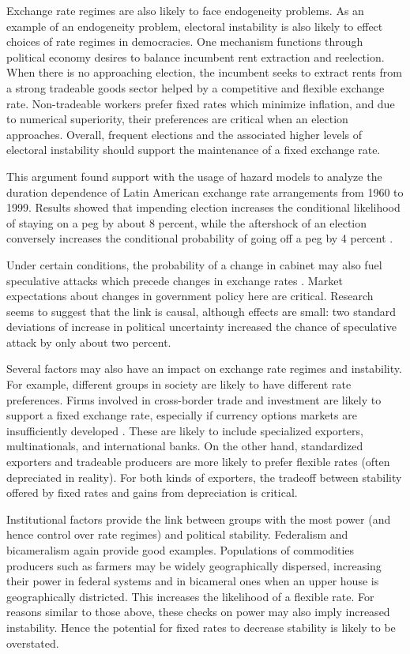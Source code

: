 \documentclass{article}
\begin{document}
    Exchange rate regimes are also likely to face endogeneity problems. As an example of an endogeneity problem, electoral instability is also likely to effect choices of rate regimes in democracies. One mechanism functions through political economy desires to balance incumbent rent extraction and reelection. When there is no approaching election, the incumbent seeks to extract rents from a strong tradeable goods sector helped by a competitive and flexible exchange rate. Non-tradeable workers prefer fixed rates which minimize inflation, and due to numerical superiority, their preferences are critical when an election approaches. Overall, frequent elections and the associated higher levels of electoral instability should support the maintenance of a fixed exchange rate.
   
    This argument found support with the usage of hazard models to analyze the duration dependence of Latin American exchange rate arrangements from 1960 to 1999. Results showed that impending election increases the conditional likelihood of staying on a peg by about 8 percent, while the aftershock of an election conversely increases the conditional probability of going off a peg by 4 percent \citep{blomberg_sustaining_2005}.
   
    Under certain conditions, the probability of a change in cabinet may also fuel speculative attacks which precede changes in exchange rates \citep{leblang_politics_2000}. Market expectations about changes in government policy here are critical. Research seems to suggest that the link is causal, although effects are small: two standard deviations of increase in political uncertainty increased the chance of speculative attack by only about two percent.
   
    Several factors may also have an impact on exchange rate regimes and instability. For example, different groups in society are likely to have different rate preferences. Firms involved in cross-border trade and investment are likely to support a fixed exchange rate, especially if currency options markets are insufficiently developed \citep{frieden_theory_2014}. These are likely to include specialized exporters, multinationals, and international banks. On the other hand, standardized exporters and tradeable producers are more likely to prefer flexible rates (often depreciated in reality). For both kinds of exporters, the tradeoff between stability offered by fixed rates and gains from depreciation is critical.
   
    Institutional factors provide the link between groups with the most power (and hence control over rate regimes) and political stability. Federalism and bicameralism again provide good examples. Populations of commodities producers such as farmers may be widely geographically dispersed, increasing their power in federal systems and in bicameral ones when an upper house is geographically districted. This increases the likelihood of a flexible rate. For reasons similar to those above, these checks on power may also imply increased instability. Hence the potential for fixed rates to decrease stability is likely to be overstated.
   
\end{document}
